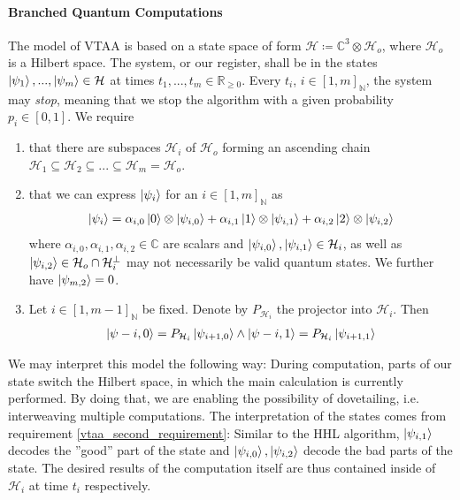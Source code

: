 \paragraph*{Branched Quantum Computations} The model of VTAA \cite[pp. 5-8]{Ambainis2010} is based on a state space of form \(\mathcal{H} \coloneqq \mathbb{C}^3 \otimes \mathcal{H}_o\), where \(\mathcal{H}_o\) is a Hilbert space. The system, or our register, shall be in the states \(\ket{\psi_1}, ..., \ket{\psi_m} \in \mathcal{H}\) at times \(t_1, ..., t_m \in \mathbb{R}_{\geq 0}\). Every \(t_i\), \(i \in [1, m]_{\mathbb{N}}\), the system may \emph{stop}, meaning that we stop the algorithm with a given probability \(p_i \in [0, 1]\). We require
\begin{enumerate}
    \item that there are subspaces \(\mathcal{H}_i\) of \(\mathcal{H}_o\) forming an ascending chain \(\mathcal{H}_1 \subseteq \mathcal{H}_2 \subseteq ... \subseteq \mathcal{H}_m = \mathcal{H}_o\).
    \item \label{vtaa_second_requirement} that we can express \(\ket{\psi_i}\) for an \(i \in [1, m]_{\mathbb{N}}\) as
    \begin{align}
        \ket{\psi_i} = \alpha_{i, 0} \ket{0} \otimes \ket{\psi_{i, 0}} + \alpha_{i, 1} \ket{1} \otimes \ket{\psi_{i, 1}} + \alpha_{i, 2} \ket{2} \otimes \ket{\psi_{i, 2}}
    \end{align}
    where \(\alpha_{i, 0}, \alpha_{i, 1}, \alpha_{i, 2} \in \mathbb{C}\) are scalars and \(\ket{\psi_{i, 0}}, \ket{\psi_{i, 1}} \in \mathcal{H}_i\), as well as \(\ket{\psi_{i, 2}} \in \mathcal{H}_o \cap \mathcal{H}_i^\perp\) may not necessarily be valid quantum states. We further have \(\ket{\psi_{m, 2}} = 0\).
    \item Let \(i \in [1, m-1]_{\mathbb{N}}\) be fixed. Denote by \(P_{\mathcal{H}_i}\) the projector into \(\mathcal{H}_i\). Then
    \begin{align}
        \ket{\psi-{i, 0}} = P_{\mathcal{H}_i}\ket{\psi_{i+1, 0}} \land \ket{\psi-{i, 1}} = P_{\mathcal{H}_i}\ket{\psi_{i+1, 1}}
    \end{align}
\end{enumerate}
We may interpret this model the following way: During computation, parts of our state switch the Hilbert space, in which the main calculation is currently performed. By doing that, we are enabling the possibility of dovetailing, i.e. interweaving multiple computations. The interpretation of the states comes from requirement \ref{vtaa_second_requirement}: Similar to the HHL algorithm, \(\ket{\psi_{i, 1}}\) decodes the ''good'' part of the state and \(\ket{\psi_{i, 0}}, \ket{\psi_{i, 2}}\) decode the bad parts of the state. The desired results of the computation itself are thus contained inside of \(\mathcal{H}_i\) at time \(t_i\) respectively.

